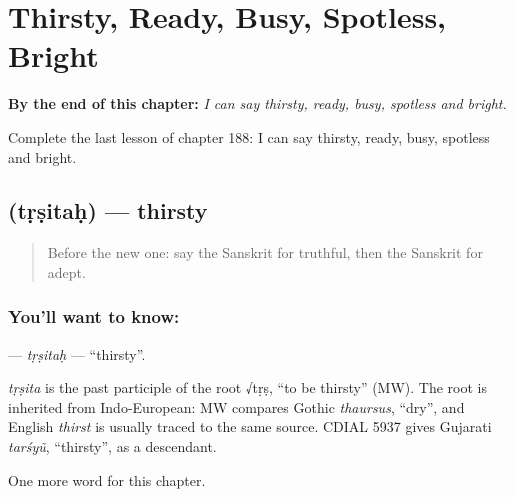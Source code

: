 
\chapter{Thirsty, Ready, Busy, Spotless, Bright}
\label{ch:sa-thirsty-ready-busy-spotless-bright}

\begin{chapteropening}
\textbf{By the end of this chapter:} \emph{I can say thirsty, ready, busy, spotless and bright.}

Complete the last lesson of chapter 188: I can say thirsty, ready, busy, spotless and bright.
\end{chapteropening}

\section[\texorpdfstring{\sk{तृषितः} (tṛṣitaḥ)}{तृषितः (tṛṣitaḥ)}]{ (tṛṣitaḥ) — thirsty}

\label{lesson:SA-C188-trsitah}



\begin{quote}
Before the new one: say the Sanskrit for truthful, then the Sanskrit for adept.
\end{quote}

\subsection*{You'll want to know: }
\textbf{} — \emph{tṛṣitaḥ} — \textquotedblleft{}thirsty\textquotedblright{}.

\begin{cousinweb}
\emph{tṛṣita} is the past participle of the root √tṛṣ, \textquotedblleft{}to be thirsty\textquotedblright{} (MW). The root is inherited from Indo-European: MW compares Gothic \emph{thaursus}, \textquotedblleft{}dry\textquotedblright{}, and English \emph{thirst} is usually traced to the same source. CDIAL 5937 gives Gujarati \emph{tarśyũ}, \textquotedblleft{}thirsty\textquotedblright{}, as a descendant.
\end{cousinweb}

\begin{grammarlens}[title={What you've built}]
One more word for this chapter.
\end{grammarlens}


